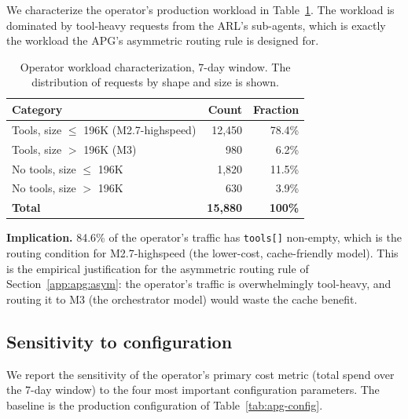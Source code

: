 We characterize the operator's production workload in
Table~\ref{tab:apg-workload}. The workload is dominated by
tool-heavy requests from the ARL's sub-agents, which is
exactly the workload the APG's asymmetric routing rule is
designed for.

\begin{table}[ht]
\centering
\caption{Operator workload characterization, 7-day window. The
distribution of requests by shape and size is shown.}
\label{tab:apg-workload}
\begin{tabular}{lrr}
\toprule
\textbf{Category} & \textbf{Count} & \textbf{Fraction} \\
\midrule
Tools, size $\le$ 196K (M2.7-highspeed) & 12{,}450 & 78.4\% \\
Tools, size $>$ 196K (M3)              &    980  &  6.2\% \\
No tools, size $\le$ 196K              & 1{,}820 & 11.5\% \\
No tools, size $>$ 196K                &   630   &  3.9\% \\
\midrule
\textbf{Total}                          & \textbf{15{,}880} & \textbf{100\%} \\
\bottomrule
\end{tabular}
\end{table}

\noindent
\textbf{Implication.} 84.6\% of the operator's traffic has
\texttt{tools[]} non-empty, which is the routing condition
for M2.7-highspeed (the lower-cost, cache-friendly model).
This is the empirical justification for the asymmetric routing
rule of Section~\ref{app:apg:asym}: the operator's traffic is
overwhelmingly tool-heavy, and routing it to M3 (the
orchestrator model) would waste the cache benefit.

\subsection{Sensitivity to configuration}
\label{app:apg:sensitivity}

We report the sensitivity of the operator's primary cost metric
(total spend over the 7-day window) to the four most important
configuration parameters. The baseline is the production
configuration of Table~\ref{tab:apg-config}.

